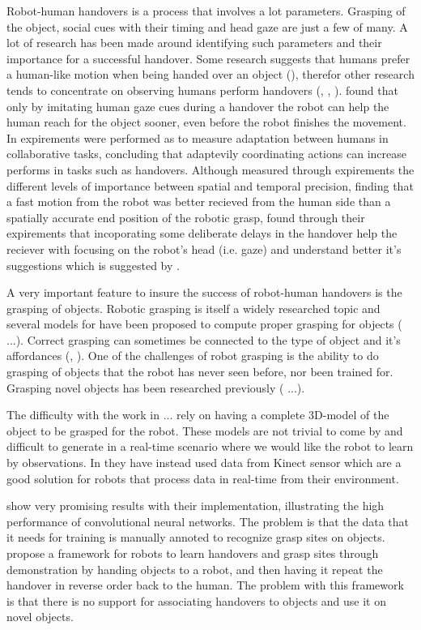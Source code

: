 Robot-human handovers is a process that involves a lot parameters. Grasping of the object, social cues with their timing and head gaze are just a few of many. A lot of research has been made around identifying such parameters and their importance for a successful handover. Some research suggests that humans prefer a human-like motion when being handed over an object (\parencite{}), therefor other research tends to concentrate on observing humans perform handovers (\parencite{Moon2014}, \parencite{Huang2015}, \parencite{Admoni2014}). \textcite{Moon2014} found that only by imitating human gaze cues during a handover the robot can help the human reach for the object sooner, even before the robot finishes the movement. In \parencite{Huang2015} expirements were performed as to measure adaptation between humans in collaborative tasks, concluding that adaptevily coordinating actions can increase performs in tasks such as handovers. Although \textcite{Koene2014} measured through expirements the different levels of importance between spatial and temporal precision, finding that a fast motion from the robot was better recieved from the human side than a spatially accurate end position of the robotic grasp, \textcite{Admoni2014} found through their expirements that incoporating some deliberate delays in the handover help the reciever with focusing on the robot's head (i.e. gaze) and understand better it's suggestions which is suggested by \parencite{Moon2014}.

A very important feature to insure the success of robot-human handovers is the grasping of objects. Robotic grasping is itself a widely researched topic and several models for have been proposed to compute proper grasping for objects (\parencite{Miller2003} ...). Correct grasping can sometimes be connected to the type of object and it's affordances (\parencite{Song2015}, \parencite{Chan2014}). One of the challenges of robot grasping is the ability to do grasping of objects that the robot has never seen before, nor been trained for. Grasping novel objects has been researched previously (\parencite{Saxena2008} \parencite{Lenz2015} \parencite{Redmon2014} ...).

The difficulty with the work in \parencite{Saxena2008} ... rely on having a complete 3D-model of the object to be grasped for the robot. These models are not trivial to come by and difficult to generate in a real-time scenario where we would like the robot to learn by observations. In \parencite{Lenz2015} \parencite{Redmon2014} \parencite{Jiang2011} they have instead used data from Kinect sensor which are a good solution for robots that process data in real-time from their environment.

\parencite{Redmon2014} show very promising results with their implementation, illustrating the high performance of convolutional neural networks. The problem is that the data that it needs for training is manually annoted to recognize grasp sites on objects. \parencite{Chan2015a} propose a framework for robots to learn handovers and grasp sites through demonstration by handing objects to a robot, and then having it repeat the handover in reverse order back to the human. The problem with this framework is that there is no support for associating handovers to objects and use it on novel objects.
